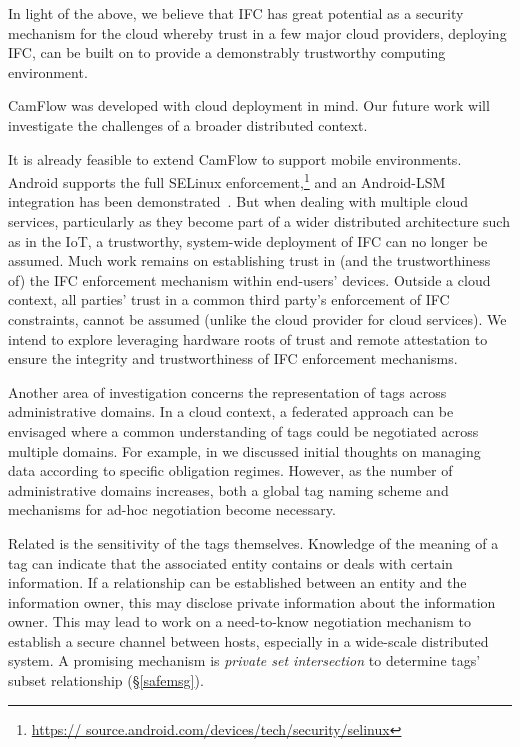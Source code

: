 \documentclass[10pt,journal,compsoc]{IEEEtran}
\begin{document}
In light of the above, we believe that IFC has great potential as a security mechanism for the cloud whereby trust in a few major cloud providers, deploying IFC, can be built on to provide a demonstrably trustworthy computing environment.

CamFlow was developed with cloud deployment in mind. 
Our future work will investigate the challenges of a broader distributed context.


It is already feasible to extend CamFlow to support mobile environments. Android 
supports the full SELinux enforcement,\footnote{\url{https://
source.android.com/devices/tech/security/selinux}} and  an 
Android-LSM integration has been demonstrated~\cite{smalley2013security}.
But when dealing with multiple cloud services, particularly as they become part of a wider distributed architecture such as in the IoT, a trustworthy, system-wide deployment of IFC can no longer be assumed.
Much work remains on establishing trust in (and the trustworthiness of) the IFC enforcement mechanism within end-users' devices.
Outside a cloud context, all parties' trust in a common third party's enforcement of IFC constraints, cannot be assumed (unlike the cloud provider for cloud services).
We intend to explore leveraging hardware roots of trust and remote attestation to ensure the integrity and trustworthiness of IFC enforcement mechanisms.


Another area of investigation concerns the representation of tags across administrative domains.
In a cloud context, a federated approach can be envisaged where a common understanding of tags could be negotiated across multiple domains.
For example, in \cite{singh2015:claw-magazine} we discussed initial thoughts on managing data according to specific obligation regimes.
However, as the number of administrative domains increases, both a global tag naming scheme and mechanisms for ad-hoc negotiation become necessary.


Related is the sensitivity of the tags themselves.
Knowledge of the meaning of a tag can indicate that the associated entity contains or deals with certain information.
If a relationship can be established between an entity and the information owner, this may disclose private information about the information owner.
This may lead to work on a need-to-know negotiation mechanism to establish a secure channel between hosts, especially in a wide-scale distributed system.
A promising mechanism is \emph{private set intersection} to determine tags' subset relationship (\S\ref{safemsg}).
\end{document}

